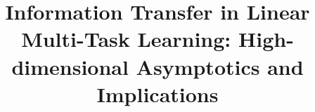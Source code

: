 \documentclass{article}
\begin{document}
\title{Information Transfer in Linear Multi-Task Learning: High-dimensional Asymptotics and Implications}
\maketitle




%





\appendix



\end{document}
